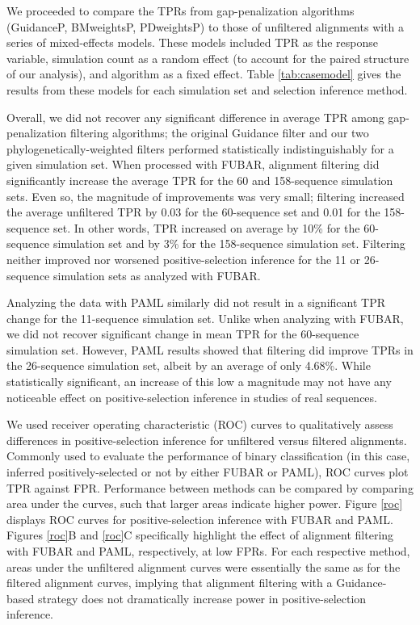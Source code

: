 \documentclass[10pt]{article}
\begin{document}
We proceeded to compare the TPRs from gap-penalization algorithms (GuidanceP, BMweightsP, PDweightsP) to those of unfiltered alignments with a series of mixed-effects models. These models included TPR as the response variable, simulation count as a random effect (to account for the paired structure of our analysis), and algorithm as a fixed effect. Table \ref{tab:casemodel} gives the results from these models for each simulation set and selection inference method.

Overall, we did not recover any significant difference in average TPR among gap-penalization filtering algorithms; the original Guidance filter and our two phylogenetically-weighted filters performed statistically indistinguishably for a given simulation set. When processed with FUBAR, alignment filtering did significantly increase the average TPR for the 60 and 158-sequence simulation sets. Even so, the magnitude of improvements was very small; filtering increased the average unfiltered TPR by 0.03 for the 60-sequence set and 0.01 for the 158-sequence set. In other words, TPR increased on average by 10\% for the 60-sequence simulation set and by 3\% for the 158-sequence simulation set. Filtering neither improved nor worsened positive-selection inference for the 11 or 26-sequence simulation sets as analyzed with FUBAR.

Analyzing the data with PAML similarly did not result in a significant TPR change for the 11-sequence simulation set. Unlike when analyzing with FUBAR, we did not recover significant change in mean TPR for the 60-sequence simulation set. However, PAML results showed that filtering did improve TPRs in the 26-sequence simulation set, albeit by an average of only 4.68\%. While statistically significant, an increase of this low a magnitude may not have any noticeable effect on positive-selection inference in studies of real sequences. 

We used receiver operating characteristic (ROC) curves to qualitatively assess differences in positive-selection inference for unfiltered versus filtered alignments. Commonly used to evaluate the performance of binary classification (in this case, inferred positively-selected or not by either FUBAR or PAML), ROC curves plot TPR against FPR. Performance between methods can be compared by comparing area under the curves, such that larger areas indicate higher power. Figure \ref{roc} displays ROC curves for positive-selection inference with FUBAR and PAML. Figures \ref{roc}B and \ref{roc}C specifically highlight the effect of alignment filtering with FUBAR and PAML, respectively, at low FPRs. For each respective method, areas under the unfiltered alignment curves were essentially the same as for the filtered alignment curves, implying that alignment filtering with a Guidance-based strategy does not dramatically increase power in positive-selection inference.
\end{document}
